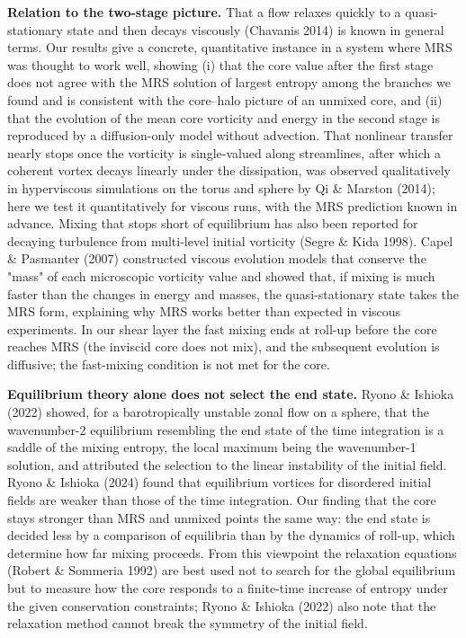 \documentclass[11pt]{article}
\begin{document}
\textbf{Relation to the two-stage picture.} That a flow relaxes quickly to a quasi-stationary state and then decays viscously (Chavanis 2014) is known in general terms. Our results give a concrete, quantitative instance in a system where MRS was thought to work well, showing (i) that the core value after the first stage does not agree with the MRS solution of largest entropy among the branches we found and is consistent with the core--halo picture of an unmixed core, and (ii) that the evolution of the mean core vorticity and energy in the second stage is reproduced by a diffusion-only model without advection. That nonlinear transfer nearly stops once the vorticity is single-valued along streamlines, after which a coherent vortex decays linearly under the dissipation, was observed qualitatively in hyperviscous simulations on the torus and sphere by Qi \& Marston (2014); here we test it quantitatively for viscous runs, with the MRS prediction known in advance. Mixing that stops short of equilibrium has also been reported for decaying turbulence from multi-level initial vorticity (Segre \& Kida 1998). Capel \& Pasmanter (2007) constructed viscous evolution models that conserve the "mass" of each microscopic vorticity value and showed that, if mixing is much faster than the changes in energy and masses, the quasi-stationary state takes the MRS form, explaining why MRS works better than expected in viscous experiments. In our shear layer the fast mixing ends at roll-up before the core reaches MRS (the inviscid core does not mix), and the subsequent evolution is diffusive; the fast-mixing condition is not met for the core.

\textbf{Equilibrium theory alone does not select the end state.} Ryono \& Ishioka (2022) showed, for a barotropically unstable zonal flow on a sphere, that the wavenumber-2 equilibrium resembling the end state of the time integration is a saddle of the mixing entropy, the local maximum being the wavenumber-1 solution, and attributed the selection to the linear instability of the initial field. Ryono \& Ishioka (2024) found that equilibrium vortices for disordered initial fields are weaker than those of the time integration. Our finding that the core stays stronger than MRS and unmixed points the same way: the end state is decided less by a comparison of equilibria than by the dynamics of roll-up, which determine how far mixing proceeds. From this viewpoint the relaxation equations (Robert \& Sommeria 1992) are best used not to search for the global equilibrium but to measure how the core responds to a finite-time increase of entropy under the given conservation constraints; Ryono \& Ishioka (2022) also note that the relaxation method cannot break the symmetry of the initial field.
\end{document}
